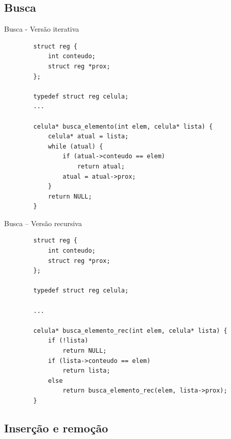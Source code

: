 \documentclass{beamer}
\begin{document}
\subsection{Busca}

\begin{frame}[fragile]{Busca - Versão iterativa}

    \begin{verbatim}
        struct reg {
            int conteudo;
            struct reg *prox;
        };

        typedef struct reg celula;
        ...

        celula* busca_elemento(int elem, celula* lista) {
            celula* atual = lista;
            while (atual) {
                if (atual->conteudo == elem)
                    return atual;
                atual = atual->prox;
            }
            return NULL;
        }
    \end{verbatim}

\end{frame}

\begin{frame}[fragile]{Busca -- Versão recursiva}

    \begin{verbatim}
        struct reg {
            int conteudo;
            struct reg *prox;
        };

        typedef struct reg celula;

        ...

        celula* busca_elemento_rec(int elem, celula* lista) {
            if (!lista)
                return NULL;
            if (lista->conteudo == elem)
                return lista;
            else
                return busca_elemento_rec(elem, lista->prox);
        }
    \end{verbatim}

\end{frame}

\subsection{Inserção e remoção}
\end{document}
